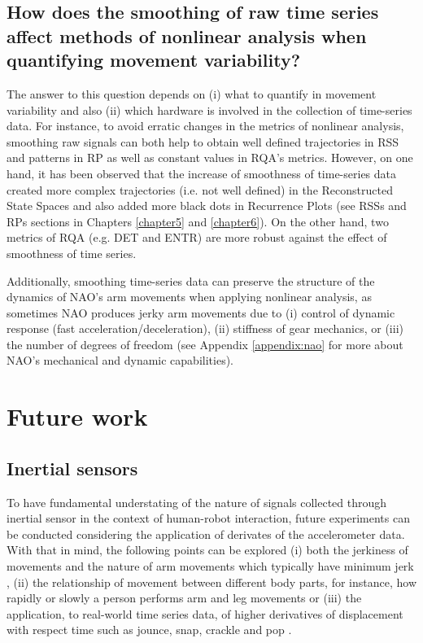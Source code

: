 \subsection*{How does the smoothing of raw time series affect 
	methods of nonlinear analysis when 
	quantifying movement variability?
}
The answer to this question depends on 
(i) what to quantify in movement variability and also 
(ii) which hardware is involved in the collection of 
time-series data. 
For instance, to avoid erratic changes in the metrics
of nonlinear analysis, smoothing raw signals can both help
to obtain well defined trajectories in RSS and patterns in RP
as well as constant values in RQA's metrics.
However, on one hand, it has been observed that the 
increase of smoothness of time-series data created 
more complex trajectories (i.e. not well defined) 
in the Reconstructed State Spaces and also added 
more black dots in Recurrence Plots 
(see RSSs and RPs sections in Chapters \ref{chapter5} and \ref{chapter6}).
On the other hand, two metrics of RQA 
(e.g. DET and ENTR) are more robust against the 
effect of smoothness of time series.

Additionally, smoothing time-series data can preserve 
the structure of the dynamics of NAO's arm movements 
when applying nonlinear analysis, as sometimes NAO 
produces jerky arm movements due to  
(i) control of dynamic response (fast acceleration/deceleration), 
(ii) stiffness of gear mechanics, or 
(iii) the number of degrees of freedom
(see Appendix \ref{appendix:nao} for more about 
NAO's mechanical and dynamic capabilities).

\section{Future work}

\subsection*{Inertial sensors}
To have fundamental understating of the nature of signals collected 
through inertial sensor in the context of human-robot interaction,
future experiments can be conducted considering the application of 
derivates of the accelerometer data. 
With that in mind, the following points can be explored 
(i) both the jerkiness of movements and the 
nature of arm movements which typically have minimum 
jerk \citep{flash1985},
(ii) the relationship of movement between different body parts, 
for instance, how rapidly or slowly a person performs arm and leg 
movements \citep{devries1982, mori2012} or (iii) 
the application, to real-world time series data, of higher derivatives 
of displacement with respect time such as jounce, snap, 
crackle and pop \citep{eager2016}.

